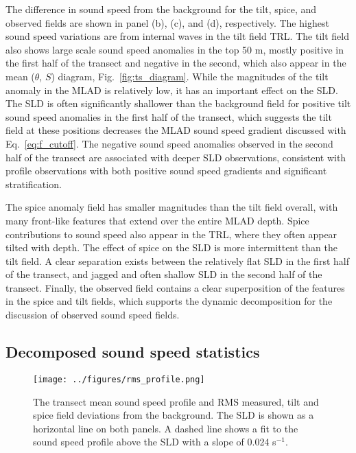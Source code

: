 \documentclass[preprint,NumberedRefs]{JASA}
\begin{document}
The difference in sound speed from the background for the tilt, spice, and observed fields are shown in panel (b), (c), and (d), respectively. The highest sound speed variations are from internal waves in the tilt field TRL. The tilt field also shows large scale sound speed anomalies in the top 50 m, mostly positive in the first half of the transect and negative in the second, which also appear in the mean ($\theta$, $S$) diagram, Fig.~\ref{fig:ts_diagram}. While the magnitudes of the tilt anomaly in the MLAD is relatively low, it has an important effect on the SLD. The SLD is often significantly shallower than the background field for positive tilt sound speed anomalies in the first half of the transect, which suggests the tilt field at these positions decreases the MLAD sound speed gradient discussed with Eq.~\eqref{eq:f_cutoff}. The negative sound speed anomalies observed in the second half of the transect are associated with deeper SLD observations, consistent with profile observations with both positive sound speed gradients and significant stratification\cite{colosi2020observations}.

The spice anomaly field has smaller magnitudes than the tilt field overall, with many front-like features that extend over the entire MLAD depth. Spice contributions to sound speed also appear in the TRL, where they often appear tilted with depth. The effect of spice on the SLD is more intermittent than the tilt field. A clear separation exists between the relatively flat SLD in the first half of the transect, and jagged and often shallow SLD in the second half of the transect. Finally, the observed field contains a clear superposition of the features in the spice and tilt fields, which supports the dynamic decomposition for the discussion of observed sound speed fields.

\subsection{Decomposed sound speed statistics}
\begin{figure}
\texttt{[image: ../figures/rms\_profile.png]}
        \caption{\label{fig:c_rms}{The transect mean sound speed profile and RMS measured, tilt and spice field deviations from the background. The SLD is shown as a horizontal line on both panels. A dashed line shows a fit to the sound speed profile above the SLD with a slope of 0.024 s$^{-1}$.}}
\end{figure}
\end{document}
